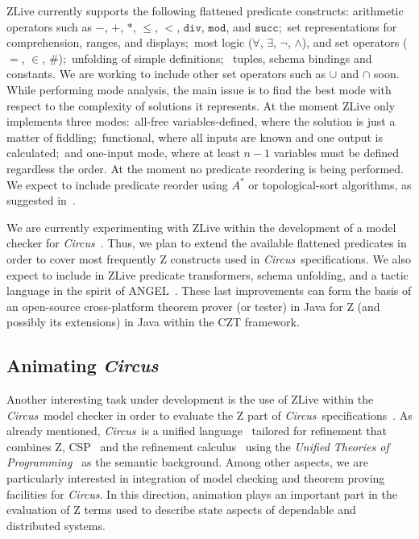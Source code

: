 \documentclass{llncs}
\newcommand{\Circus}{{\sf\slshape Circus}}
\begin{document}
    ZLive currently supports the following flattened predicate
    constructs: arithmetic operators such as $-$, $+$, $*$, $\leq$,
    $<$, $\mathtt{div}$, $\mathtt{mod}$, and $\mathtt{succ}$;~set
    representations for comprehension, ranges, and displays;~most
    logic ($\forall$, $\exists$, $\lnot$, $\land$), and set operators
    ($=$, $\in$, $\#$);~unfolding of simple definitions; ~tuples,
    schema bindings and constants.  We are working to include other
    set operators such as $\cup$ and $\cap$ soon.  While performing
    mode analysis, the main issue is to find the best mode with
    respect to the complexity of solutions it represents. At the
    moment ZLive only implements three modes:~all-free
    variables-defined, where the solution is just a matter of
    fiddling;~functional, where all inputs are known and one output is
    calculated;~and one-input mode, where at least $n-1$ variables
    must be defined regardless the order. At the moment no predicate
    reordering is being performed.  We expect to include predicate
    reorder using $A^*$ or topological-sort algorithms, as suggested
    in~\cite{winikooff98}.

    We are currently experimenting with ZLive within the development
    of a model checker for \Circus~\cite{circus.mc:leo}.  Thus, we
    plan to extend the available flattened predicates in order to
    cover most frequently Z constructs used in \Circus\
    specifications.  We also expect to include in ZLive predicate
    transformers, schema unfolding, and a tactic language in the
    spirit of ANGEL~\cite{z.others:angel}.  These last improvements
    can form the basis of an open-source cross-platform theorem prover
    (or tester) in Java for Z (and possibly its extensions) in Java
    within the CZT framework.

\subsection{Animating \Circus}

    Another interesting task under development is the use of ZLive
    within the \Circus\ model checker in order to evaluate the Z part
    of \Circus\ specifications~\cite{circus.mc:leo}.  As already
    mentioned, \Circus\ is a unified language~\cite{circus.sem:intro}
    tailored for refinement that combines Z,
    CSP~\cite{csp.books:roscoe} and the refinement
    calculus~\cite{fm.ref:morgan} using the \textit{Unified Theories
    of Programming}~\cite{hoare.utp} as the semantic background.
    Among other aspects, we are particularly interested in integration
    of model checking and theorem proving facilities for \Circus. In
    this direction, animation plays an important part in the
    evaluation of Z terms used to describe state aspects of dependable
    and distributed systems.
\end{document}
